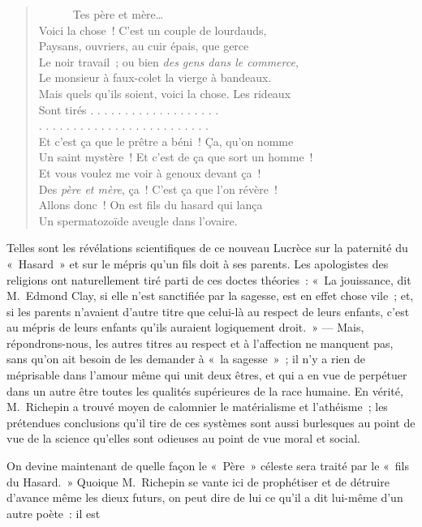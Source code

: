 \documentclass[french,twoside]{book} %
\begin{document}
\begin{verse}
      Tes père et mère…\\
Voici la chose ! C’est un couple de lourdauds,\\
Paysans, ouvriers, au cuir épais, que gerce\\
Le noir travail ; ou bien \emph{des gens dans le commerce},\\
Le monsieur à faux-colet la vierge à bandeaux.\\
Mais quels qu’ils soient, voici la chose. Les rideaux\\
Sont tirés . . . . . . . . . . . . . . . . . . .\\
. . . . . . . . . . . . . . . . . . . . . . . . .\\
Et c’est ça que le prêtre a béni ! Ça, qu’on nomme\\
Un saint mystère ! Et c’est de ça que sort un homme !\\
Et vous voulez me voir à genoux devant ça !\\
Des \emph{père et mère}, ça ! C’est ça que l’on révère !\\
Allons donc ! On est fils du hasard qui lança\\
Un spermatozoïde aveugle dans l’ovaire.\\
\end{verse}

\noindent Telles sont les révélations scientifiques de ce nouveau Lucrèce sur la paternité du « Hasard » et sur le mépris qu’un fils doit à ses parents. Les apologistes des religions ont naturellement tiré parti de ces doctes théories : « La jouissance, dit M. Edmond Clay, si elle n’est sanctifiée par la sagesse, est en effet chose vile ; et, si les parents n’avaient d’autre titre que celui-là au respect de leurs enfants, c’est au mépris de leurs enfants qu’ils auraient logiquement droit. » — Mais, répondrons-nous, les autres titres au respect et à l’affection ne manquent pas, sans qu’on ait besoin de les demander à « la sagesse » ; il n’y a rien de méprisable dans l’amour même qui unit deux êtres, et qui a en vue de perpétuer dans un autre être toutes les qualités supérieures de la race humaine. En vérité, M. Richepin a trouvé moyen de calomnier le matérialisme et l’athéisme ; les prétendues conclusions qu’il tire de ces systèmes sont aussi burlesques au point de vue de la science qu’elles sont odieuses au point de vue moral et social.\par
On devine maintenant de quelle façon le « Père » céleste sera traité par le « fils du Hasard. » Quoique M. Richepin se vante ici de prophétiser et de détruire d’avance même les dieux futurs, on peut dire de lui ce qu’il a dit lui-même d’un autre poète : il est\par
\end{document}

